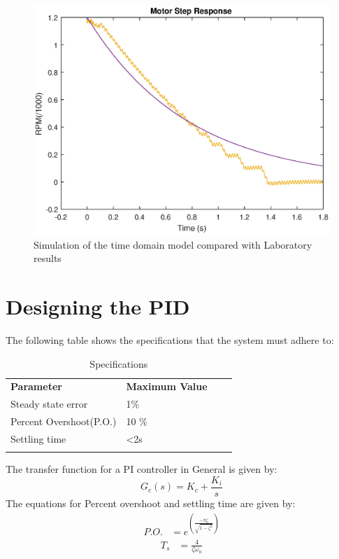 \begin{figure}[h]
    \myfloatalign
    \includegraphics[width=1.2\textwidth]{gfx/Motor_shutoff_vs_Time_domain_model} %
    \caption{Simulation of the time domain model compared with Laboratory results}
    \label{fig:shutoff_vs_model}
\end{figure}
\section{Designing the PID}
The following table shows the specifications that the system must adhere to:

\begin{table}[h]
\centering
\caption{Specifications}
\label{tbl:spec}
\begin{tabular}{llll}
\cline{1-2}
\multicolumn{1}{|l|}{\textbf{Parameter}}      & \multicolumn{1}{l|}{\textbf{Maximum Value}} &  &  \\ \cline{1-2}
\multicolumn{1}{|l|}{Steady state error}    & \multicolumn{1}{l|}{1\%}                   &  &  \\ \cline{1-2}
\multicolumn{1}{|l|}{Percent Overshoot(P.O.)} & \multicolumn{1}{l|}{10 \%}                       &  &  \\ \cline{1-2}
\multicolumn{1}{|l|}{Settling time} & \multicolumn{1}{l|}{<2s}                       &  &  \\ \cline{1-2}
                                              &                                             &  & 
\end{tabular}

\end{table}
The transfer function for a PI controller in General is given by:
\begin{equation}\label{eq:2}
	G_{c}(s) = K_{c}+ \frac{K_{i}}{s}
\end{equation}
The equations for Percent overshoot and settling time are given by:
\begin{align} \label{eq:poform}
P.O. &= e^{\left( \frac{-\pi\zeta}{\sqrt{1-\zeta^2}}\right)}
\end{align}
\begin{align}\label{eq:tsform}
T_s &= \frac{4}{\zeta\omega_n}
\end{align}

